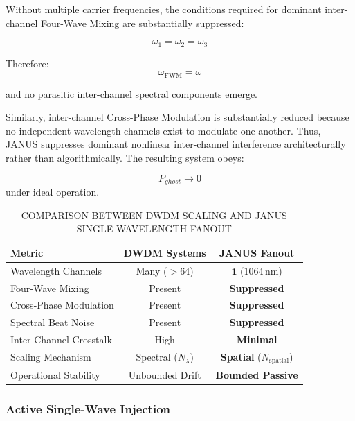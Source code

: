 \documentclass[journal]{IEEEtran}
\begin{document}
Without multiple carrier frequencies, the conditions required for dominant inter-channel Four-Wave Mixing are substantially suppressed:

\begin{equation}
\omega_1 = \omega_2 = \omega_3
\end{equation}

Therefore:
\begin{equation}
\omega_{\text{FWM}} =  \omega
\end{equation}

and no parasitic inter-channel spectral components emerge. 

Similarly, inter-channel Cross-Phase Modulation is substantially reduced because no independent wavelength channels exist to modulate one another. Thus, JANUS suppresses dominant nonlinear inter-channel interference architecturally rather than algorithmically. The resulting system obeys:

\begin{equation}
P_{ghost} \rightarrow 0
\end{equation}
under ideal operation.

\begin{table}[htbp]
\centering
\footnotesize
\renewcommand{\arraystretch}{1.15}
\caption{COMPARISON BETWEEN DWDM SCALING AND JANUS SINGLE-WAVELENGTH FANOUT}
\label{tab:table7}
\begin{tabularx}{\columnwidth}{@{}Xcc@{}}
\toprule
\textbf{Metric} & \textbf{DWDM Systems} & \textbf{JANUS Fanout} \\
\midrule
Wavelength Channels & Many ($>64$) & $\mathbf{1}$ ($1064\,\mathrm{nm}$) \\
Four-Wave Mixing & Present & \textbf{Suppressed} \\
Cross-Phase Modulation & Present & \textbf{Suppressed} \\
Spectral Beat Noise & Present & \textbf{Suppressed} \\
Inter-Channel Crosstalk & High & \textbf{Minimal} \\
Scaling Mechanism & Spectral ($N_\lambda$) & \textbf{Spatial} ($N_{\mathrm{spatial}}$) \\
Operational Stability & Unbounded Drift & \textbf{Bounded Passive} \\
\bottomrule
\end{tabularx}
\end{table}

\subsubsection{\textbf{Active Single-Wave Injection}}
\end{document}
